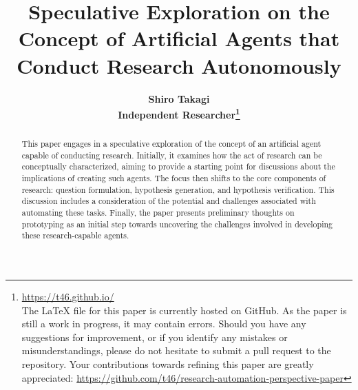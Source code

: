 \documentclass{article}
\title{\bfseries Speculative Exploration on the Concept of Artificial Agents that Conduct Research Autonomously}
\author{\normalsize \bfseries Shiro Takagi \\
\normalsize Independent Researcher\footnote{\href{https://t46.github.io/}{https://t46.github.io/} \\
The LaTeX file for this paper is currently hosted on GitHub. As the paper is still a work in progress, it may contain errors. Should you have any suggestions for improvement, or if you identify any mistakes or misunderstandings, please do not hesitate to submit a pull request to the repository. Your contributions towards refining this paper are greatly appreciated: \href{https://github.com/t46/research-automation-perspective-paper}{https://github.com/t46/research-automation-perspective-paper} }}
\date{}
\begin{document}
\sloppy
\maketitle


\begin{abstract}
This paper engages in a speculative exploration of the concept of an artificial agent capable of conducting research. Initially, it examines how the act of research can be conceptually characterized, aiming to provide a starting point for discussions about the implications of creating such agents. The focus then shifts to the core components of research: question formulation, hypothesis generation, and hypothesis verification. This discussion includes a consideration of the potential and challenges associated with automating these tasks. Finally, the paper presents preliminary thoughts on prototyping as an initial step towards uncovering the challenges involved in developing these research-capable agents.
\end{abstract}

\tableofcontents




% 
% 
% 



% 


\appendix

\end{document}
